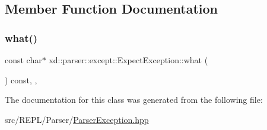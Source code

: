 \subsection{Member Function Documentation}
\mbox{\label{classxd_1_1parser_1_1except_1_1_expect_exception_a0aa811fd2ae98e0611bf7535c01864ec}} 
\subsubsection{\texorpdfstring{what()}{what()}}
{\footnotesize\ttfamily const char$\ast$ xd\+::parser\+::except\+::\+Expect\+Exception\+::what (\begin{DoxyParamCaption}{ }\end{DoxyParamCaption}) const\hspace{0.3cm}{\ttfamily [inline]}, {\ttfamily [override]}, {\ttfamily [noexcept]}}



The documentation for this class was generated from the following file\+:\begin{DoxyCompactItemize}
\item 
src/\+R\+E\+P\+L/\+Parser/\mbox{\hyperlink{_parser_exception_8hpp}{Parser\+Exception.\+hpp}}\end{DoxyCompactItemize}
